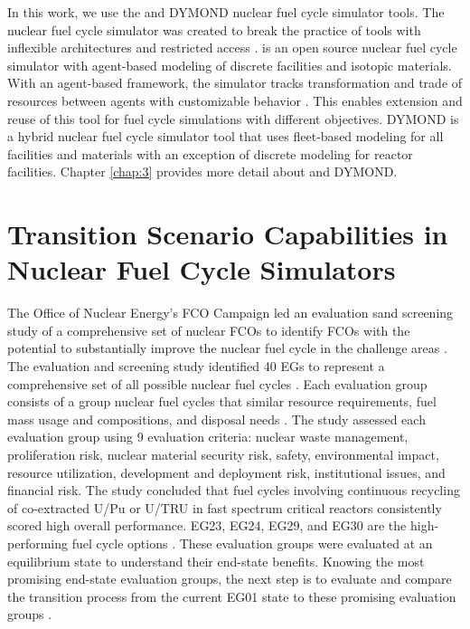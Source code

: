 In this work, we use the \Cyclus and DYMOND nuclear fuel cycle simulator tools. 
The \Cyclus nuclear fuel cycle simulator was created to break the practice of 
tools with inflexible architectures and restricted access \cite{huff_fundamental_2016}.
\Cyclus is an open source nuclear fuel cycle simulator with agent-based 
modeling of discrete facilities and isotopic materials. 
With an agent-based framework, the simulator tracks transformation and 
trade of resources between agents with customizable behavior
\cite{huff_fundamental_2016}. 
This enables extension and reuse of this tool for fuel cycle 
simulations with different objectives. 
DYMOND is a hybrid nuclear fuel cycle simulator tool that uses fleet-based 
modeling for all facilities and materials 
with an exception of discrete modeling for reactor facilities. 
Chapter \ref{chap:3} provides more detail about \Cyclus and DYMOND. 

\section{Transition Scenario Capabilities in Nuclear Fuel Cycle Simulators}
\label{sec:egs}
The Office of Nuclear Energy's
\gls{FCO} Campaign led an evaluation 
sand screening study of a comprehensive set of nuclear \glspl{FCO} 
to identify \glspl{FCO} with the potential to substantially 
improve the nuclear fuel cycle in the challenge areas
\cite{wigeland_nuclear_2014}. 
The evaluation and screening study identified 40 
\glspl{EG} to represent a comprehensive set of 
all possible nuclear fuel cycles \cite{wigeland_nuclear_2014}. 
Each evaluation group consists of a group nuclear fuel cycles that
similar resource requirements, fuel mass usage and compositions, 
and disposal needs \cite{wigeland_nuclear_2014}. 
The study assessed each evaluation group using 
9 evaluation criteria: nuclear waste management, 
proliferation risk, nuclear material security risk, 
safety, environmental impact, resource utilization, 
development and deployment risk, institutional issues, and 
financial risk.  
The study concluded that fuel cycles
involving continuous recycling of co-extracted U/Pu or U/TRU in 
fast spectrum critical reactors consistently scored high overall 
performance.
EG23, EG24, EG29, and EG30 are the high-performing fuel cycle options
\cite{wigeland_nuclear_2014}.
These evaluation groups were evaluated at an equilibrium state to 
understand their end-state benefits.
Knowing the most promising end-state evaluation groups,
the next step is to evaluate and compare the transition process 
from the current EG01 
state to these promising evaluation groups \cite{feng_standardized_2016}. 

